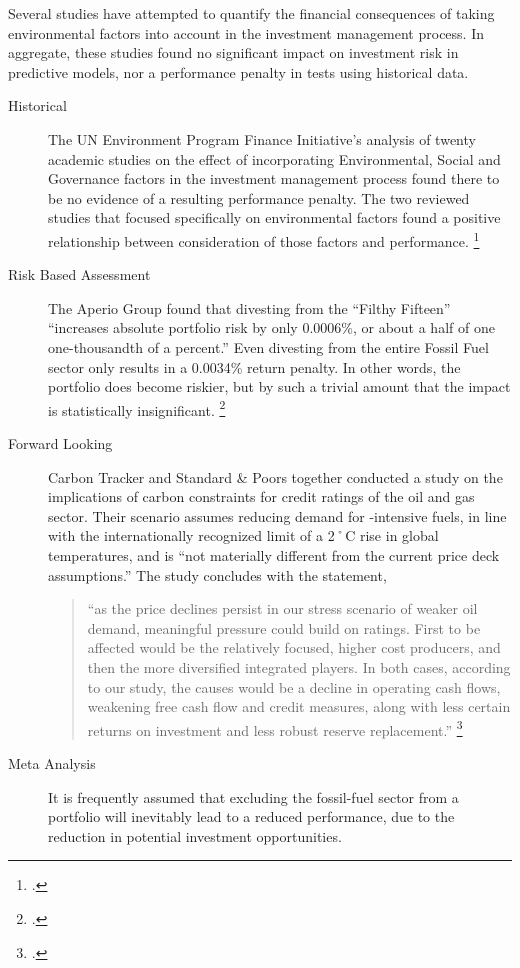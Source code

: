 Several studies have attempted to quantify the financial consequences of taking environmental factors into account in the investment management process.
In aggregate, these studies found no significant impact on investment risk in predictive models, nor a performance penalty in tests using historical data.
\begin{description}
  \item[Historical] The UN Environment Program Finance Initiative's analysis of twenty academic studies on the effect of incorporating Environmental, Social and Governance factors in the investment management process found there to be no evidence of a resulting performance penalty.  The two reviewed studies that focused specifically on environmental factors found a positive relationship between consideration of those factors and performance. \footcite{UNEPFI2007}
  \item[Risk Based Assessment] The Aperio Group found that divesting from the ``Filthy Fifteen'' ``increases absolute portfolio risk by only 0.0006\%, or about a half of one one-thousandth of a percent.'' Even divesting from the entire Fossil Fuel sector only results in a 0.0034\% return penalty. In other words, the portfolio does become riskier, but by such a trivial amount that the impact is statistically insignificant. \footcite{Aperio2013}
  \item[Forward Looking] Carbon Tracker and Standard \& Poors together conducted a study on the implications of carbon constraints for credit ratings of the oil and gas sector. Their scenario assumes reducing demand for -intensive fuels, in line with the internationally recognized limit of a 2˚C rise in global temperatures, and is ``not materially different from the current price deck assumptions.'' The study concludes with the statement,
  \begin{quote} ``as the price declines persist in our stress scenario of weaker oil demand, meaningful pressure could build on ratings. First to be affected would be the relatively focused, higher cost producers, and then the more diversified integrated players. In both cases, according to our study, the causes would be a decline in operating cash flows, weakening free cash flow and credit measures, along with less certain returns on investment and less robust reserve replacement.'' \footcite{SandPConstrained}
  \end{quote}
  \item[Meta Analysis] It is frequently assumed that excluding the fossil-fuel sector from a portfolio will inevitably lead to a reduced performance, due to the reduction in potential investment opportunities.

\end{description}
